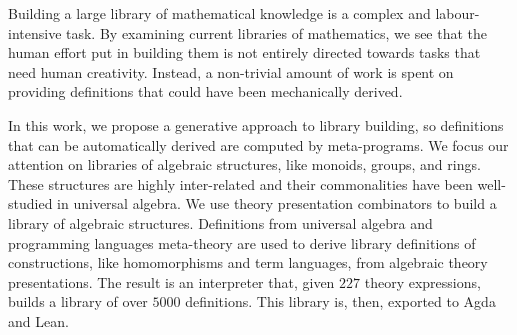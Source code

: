
Building a large library of mathematical knowledge is a complex and labour-intensive task.
By examining current libraries of mathematics, we see that the human effort put in building them is not entirely directed towards tasks that need human creativity. 
Instead, a non-trivial amount of work is spent on providing definitions that could have been mechanically derived.


In this work, we propose a generative approach to library building, so definitions that can be automatically derived are computed by meta-programs. We focus our attention on libraries of algebraic structures, like monoids, groups, and rings. 
These structures are highly inter-related and their commonalities have been well-studied in universal algebra. We use theory presentation combinators to build a library of algebraic structures. Definitions from universal algebra and programming languages meta-theory are used to derive library definitions of constructions, like homomorphisms and term languages, from algebraic theory presentations. The result is an interpreter that, given $227$ theory expressions, builds a library of over $5000$ definitions. This library is, then, exported to Agda and Lean. 




